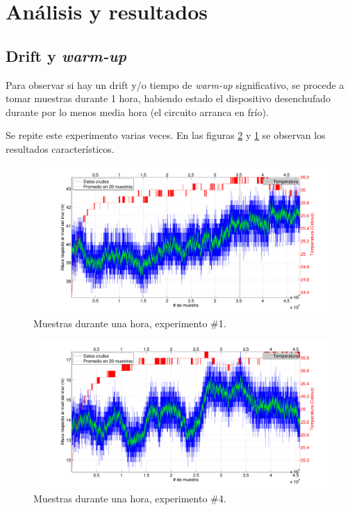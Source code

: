 \documentclass[main]{subfiles}
\begin{document}
\newpage
\section{Análisis y resultados}

\subsection{Drift y \textit{warm-up}}
\label{sec:drift-y-warm-up}

Para observar si hay un drift y/o tiempo de \textit{warm-up} significativo, se procede a tomar muestras durante 1 hora, habiendo estado el dispositivo desenchufado durante por lo menos media hora (el circuito arranca en frío).

Se repite este experimento varias veces. En las figuras \ref{fig:1hora_04.pdf} y \ref{fig:1hora_01.pdf} se observan los resultados característicos.

\begin{figure}[h!]
  \includegraphics[width=.9\textwidth]{./pics_barom/1hora_01.pdf}
  \caption{Muestras durante una hora, experimento \#1.}
  \label{fig:1hora_01.pdf}
\end{figure}
\vspace{-20pt}
\begin{figure}[h!]
  \includegraphics[width=.9\textwidth]{./pics_barom/1hora_04.pdf}
  \caption{Muestras durante una hora, experimento \#4.}
  \label{fig:1hora_04.pdf}
\end{figure}
\end{document}
